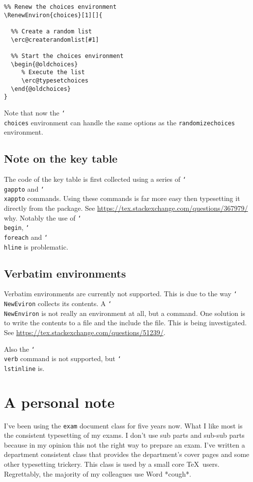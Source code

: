 \documentclass[12pt,a4paper]{exam}
\providecommand{\texorpdfstring}[2]{#1}
\newcommand{\bs}{\texorpdfstring{\char`\\}{}}
\begin{document}
\begin{lstlisting}
%% Renew the choices environment
\RenewEnviron{choices}[1][]{

  %% Create a random list
  \erc@createrandomlist[#1]

  %% Start the choices environment
  \begin{@oldchoices}
     % Execute the list
     \erc@typesetchoices
  \end{@oldchoices}
}
\end{lstlisting}

Note that now the \texttt{\bs choices} environment can handle the same options as the
\texttt{randomizechoices} environment.

\subsection{Note on the key table}
The code of the key table is first collected using a series of \texttt{\bs gappto} and
\texttt{\bs xappto} commands. Using these commands is far more easy then typesetting it
directly from the package. See \url{https://tex.stackexchange.com/questions/367979/}
why. Notably the use of \texttt{\bs begin}, \texttt{\bs foreach} and \texttt{\bs hline}
is problematic.

\subsection{Verbatim environments}
Verbatim environments are currently not supported. This is due to the way \texttt{\bs NewEviron}
collects its contents. A \texttt{\bs NewEnviron} is not really an environment at all, but a
command. One solution is to write the contents to a file and the include the file. This is
being investigated. See
\url{https://tex.stackexchange.com/questions/51239/}.

Also the \texttt{\bs verb} command is not supported, but \texttt{\bs lstinline} is.

\section{A personal note}
I've been using the \texttt{exam} document class for five years now. What I like most
is the consistent typesetting of my exams. I don't use sub parts and sub-sub parts
because in my opinion this not the right way to prepare an exam. I've written a
department consistent class that provides the department's cover pages and some
other typesetting trickery. This class is used by a small core \TeX\ users. Regrettably,
the majority of my colleagues use Word *cough*.
\end{document}
